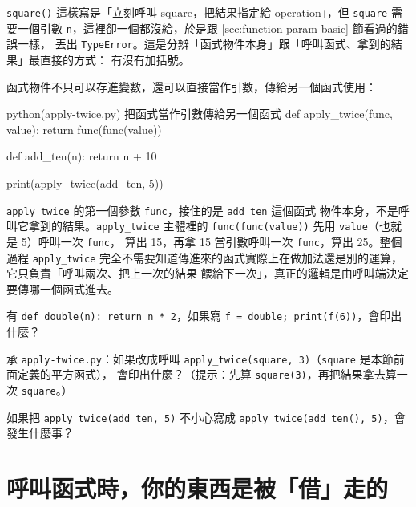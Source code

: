 \texttt{square()} 這樣寫是「立刻呼叫 square，把結果指定給 operation」，但
\texttt{square} 需要一個引數 \texttt{n}，這裡卻一個都沒給，於是跟 \ref{sec:function-param-basic} 節看過的錯誤一樣，
丟出 \texttt{TypeError}。這是分辨「函式物件本身」跟「呼叫函式、拿到的結果」最直接的方式：
有沒有加括號。

函式物件不只可以存進變數，還可以直接當作引數，傳給另一個函式使用：

\begin{example}{python}{(apply-twice.py) 把函式當作引數傳給另一個函式}
def apply_twice(func, value):
    return func(func(value))


def add_ten(n):
    return n + 10


print(apply_twice(add_ten, 5))
\end{example}


\texttt{apply\_twice} 的第一個參數 \texttt{func}，接住的是 \texttt{add\_ten} 這個函式
物件本身，不是呼叫它拿到的結果。\texttt{apply\_twice} 主體裡的
\texttt{func(func(value))} 先用 \texttt{value}（也就是 5）呼叫一次 \texttt{func}，
算出 15，再拿 15 當引數呼叫一次 \texttt{func}，算出 25。整個過程 \texttt{apply\_twice}
完全不需要知道傳進來的函式實際上在做加法還是別的運算，它只負責「呼叫兩次、把上一次的結果
餵給下一次」，真正的邏輯是由呼叫端決定要傳哪一個函式進去。


\begin{drills}[label=drills:function-first-class]
\item 有 \texttt{def double(n): return n * 2}，如果寫
\texttt{f = double; print(f(6))}，會印出什麼？
\item 承 \texttt{apply-twice.py}：如果改成呼叫
\texttt{apply\_twice(square, 3)}（\texttt{square} 是本節前面定義的平方函式），
會印出什麼？（提示：先算 \texttt{square(3)}，再把結果拿去算一次 \texttt{square}。）
\item 如果把 \texttt{apply\_twice(add\_ten, 5)} 不小心寫成
\texttt{apply\_twice(add\_ten(), 5)}，會發生什麼事？
\end{drills}

\section{呼叫函式時，你的東西是被「借」走的}
\label{sec:function-nametag}

